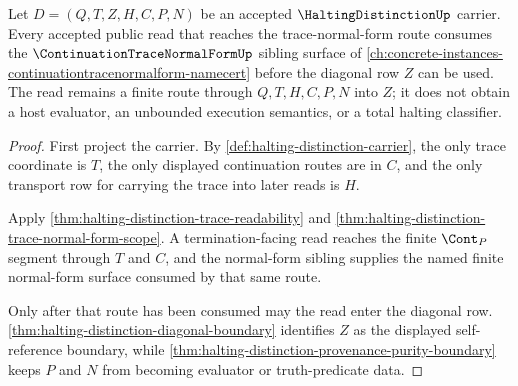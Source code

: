 \begin{theorem}
\label{thm:halting-distinction-normal-form-route-consumption}
Let $D=(Q,T,Z,H,C,P,N)$ be an accepted $\HaltingDistinctionUp$ carrier. Every accepted public read that reaches the trace-normal-form route consumes the $\ContinuationTraceNormalFormUp$ sibling surface of \autoref{ch:concrete-instances-continuationtracenormalform-namecert} before the diagonal row $Z$ can be used. The read remains a finite route through $Q,T,H,C,P,N$ into $Z$; it does not obtain a host evaluator, an unbounded execution semantics, or a total halting classifier.
\end{theorem}
\begin{proof}
First project the carrier. By \autoref{def:halting-distinction-carrier}, the only trace coordinate is $T$, the only displayed continuation routes are in $C$, and the only transport row for carrying the trace into later reads is $H$.

Apply \autoref{thm:halting-distinction-trace-readability} and \autoref{thm:halting-distinction-trace-normal-form-scope}. A termination-facing read reaches the finite $\Cont_P$ segment through $T$ and $C$, and the normal-form sibling supplies the named finite normal-form surface consumed by that same route.

Only after that route has been consumed may the read enter the diagonal row. \autoref{thm:halting-distinction-diagonal-boundary} identifies $Z$ as the displayed self-reference boundary, while \autoref{thm:halting-distinction-provenance-purity-boundary} keeps $P$ and $N$ from becoming evaluator or truth-predicate data.
\end{proof}

